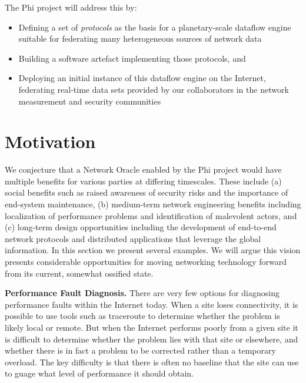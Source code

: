 \documentclass[twocolumn,10pt]{article}
\newcommand{\note}[1]{}
\def\Sys{Network Oracle\xspace}
\def\Lrp{Phi\xspace}
\begin{document}
The \Lrp project will address this by:
\begin{itemize}
\item Defining a set of \textit{protocols} as the basis for a
planetary-scale dataflow engine suitable for federating many
heterogeneous sources of network data
\item Building a software artefact implementing those protocols, and
\item Deploying an initial instance of this dataflow engine on the
  Internet, federating real-time data sets provided by our
  collaborators in the network measurement and security communities
\end{itemize}

\section{Motivation}
\label{sec:forwhom}

We conjecture that a \Sys enabled by the \Lrp project would have
multiple benefits for various parties at differing timescales.  These
include (a) social benefits such as raised awareness of security risks
and the importance of end-system maintenance, (b) medium-term network
engineering benefits including localization of performance problems
and identification of malevolent actors, and (c) long-term design
opportunities including the development of end-to-end network
protocols and distributed applications that leverage the global information.
In this section we present several examples.
We will argue this vision presents considerable opportunities 
for moving networking technology forward from its current, somewhat
ossified state. 

\vspace{1em}\noindent
{\bf Performance Fault Diagnosis.}  
\note{Wetherall} There are
very few options for diagnosing performance faults within the
Internet today. When a site loses connectivity, it is possible to
use tools such as traceroute to determine whether the problem is
likely local or remote. But when the Internet performs poorly from a
given site it is difficult to determine whether the problem lies
with that site or elsewhere, and whether there is in fact a problem
to be corrected rather than a temporary overload.  The key
difficulty is that there is often no baseline that the site can use
to guage what level of performance it should obtain.
\end{document}
